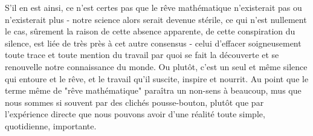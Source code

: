 S'il en est ainsi, ce n'est certes pas que le rêve mathématique n'existerait pas ou n'existerait plus - notre science alors serait devenue stérile, ce qui n'est nullement le cas, sûrement la raison de cette absence apparente, de cette conspiration du silence, est liée de très près à cet autre consensus - celui d'effacer soigneusement toute trace et toute mention du travail par quoi se fait la découverte et se renouvelle notre connaissance du monde. Ou plutôt, c'est un seul et même silence qui entoure et le rêve, et le travail qu'il suscite, inspire et nourrit. Au point que le terme même de "rêve mathématique" paraîtra un non-sens à beaucoup, mus que nous sommes si souvent par des clichés pousse-bouton, plutôt que par l'expérience directe que nous pouvons avoir d'une réalité toute simple, quotidienne, importante.

